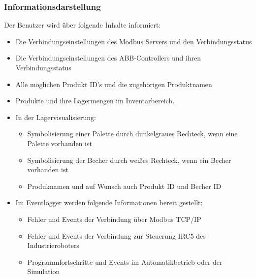\subsubsection{Informationsdarstellung}
Der Benutzer wird über folgende Inhalte informiert:\\
\begin{itemize}
    \item Die Verbindungseinstellungen des Modbus Servers und den Verbindungsstatus
    \item Die Verbindungseinstellungen des ABB-Controllers und ihren Verbindungsstatus
    \item Alle möglichen Produkt ID's und die zugehörigen Produktnamen
    \item Produkte und ihre Lagermengen im Inventarbereich.
    \item In der Lagervisualisierung:
    \begin{itemize}
        \item Symbolisierung einer Palette durch dunkelgraues Rechteck, wenn eine Palette vorhanden ist
        \item Symbolisierung der Becher durch weißes Rechteck, wenn ein Becher vorhanden ist
        \item Produknamen und auf Wunsch auch Produkt ID und Becher ID
    \end{itemize}
    \item Im Eventlogger werden folgende Informationen bereit gestellt:
    \begin{itemize}
        \item Fehler und Events der Verbindung über Modbus TCP/IP
        \item Fehler und Events der Verbindung zur Steuerung IRC5 des Industrieroboters
        \item Programmfortschritte und Events im Automatikbetrieb oder der Simulation
    \end{itemize}
\end{itemize}



